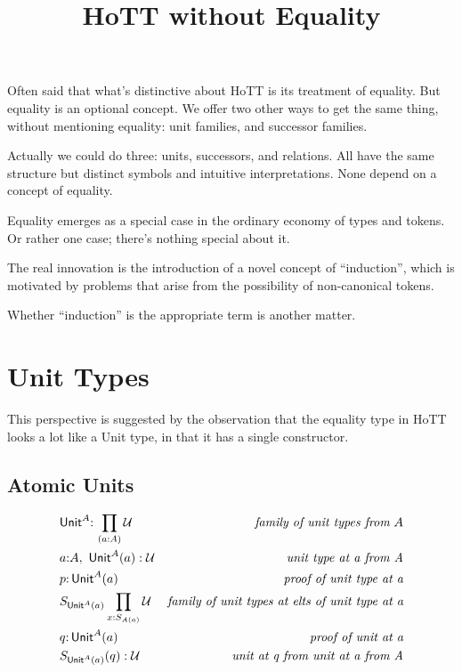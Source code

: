 \documentclass{article}
\begin{document}
\title{HoTT without Equality}
\maketitle
\tableofcontents
\vfill
\large

Often said that what's distinctive about HoTT is its treatment of
equality.  But equality is an optional concept.  We offer two other
ways to get the same thing, without mentioning equality: unit
families, and successor families.

Actually we could do three: units, successors, and relations.  All
have the same structure but distinct symbols and intuitive
interpretations.  None depend on a concept of equality.

Equality emerges as a special case in the ordinary economy of types
and tokens.  Or rather one case; there's nothing special about it.

The real innovation is the introduction of a novel concept of
``induction'', which is motivated by problems that arise from the
possibility of non-canonical tokens.

Whether ``induction'' is the appropriate term is another matter.

\section{Unit Types}

This perspective is suggested by the observation that the equality
type in HoTT looks a lot like a Unit type, in that it has a single
constructor.

\subsection{Atomic Units}

\begin{align}
  & \textsf{Unit}^A{:}\,\prod\limits_{(a:A)}\mathcal{U} & \textit{family of unit types from}\ A \\
  & a{:}A,\ \textsf{Unit}^A(a):\mathcal{U} & \textit{unit type at a from A} \\
  & p{:}\,\textsf{Unit}^A(a) & \textit{proof of unit type at a} \\
  & S_{\textsf{Unit}^A(a)}\prod\limits_{x{:}S_{A(a)}}\mathcal{U} & \textit{family of unit types at elts of unit type at a} \\
  & q{:}\,\textsf{Unit}^A(a) & \textit{proof of unit at a} \\
  & S_{\textsf{Unit}^A(a)}(q):\mathcal{U} & \textit{unit at q from unit at a from A}
\end{align}
\end{document}
